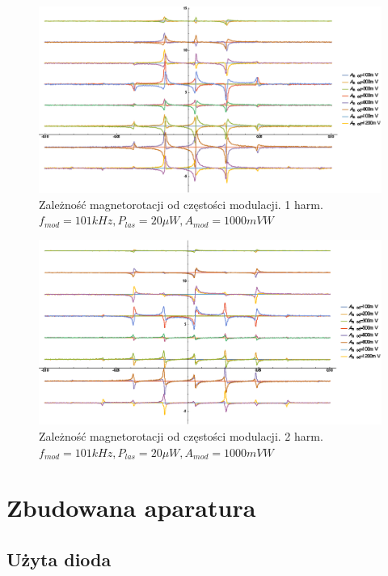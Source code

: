 \documentclass[a4paper,10pt,twoside]{article}
\begin{document}
\begin{figure}[h!]
\centering
 \includegraphics[width=\textwidth]{panoramy_1H_odam.eps}
 \caption{Zależność magnetorotacji od częstości modulacji. 1 harm. $f_{mod}=101kHz, P_{las}=20 \mu W, A_{mod}=1000mV W$}
 \label{fig:panodam1}
\end{figure}

\begin{figure}[h!]
\centering
 \includegraphics[width=\textwidth]{panoramy_2H_odam.eps}
 \caption{Zależność magnetorotacji od częstości modulacji. 2 harm. $f_{mod}=101kHz, P_{las}=20 \mu W, A_{mod}=1000mV W$}
 \label{fig:panodam2}
\end{figure}

\section{Zbudowana aparatura}
\label{ch:aparatura}
\subsection{Użyta dioda}
\end{document}
